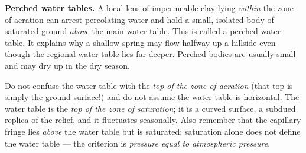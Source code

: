 \documentclass[11pt]{article}
\newcommand{\cle}[1]{{\popxbold\color{popdark}#1}}
\begin{document}
\textbf{Perched water tables.} A local lens of impermeable clay lying \emph{within} the zone of aeration can arrest percolating water and hold a small, isolated body of saturated ground \emph{above} the main water table. This is called a \cle{perched water table}. It explains why a shallow spring may flow halfway up a hillside even though the regional water table lies far deeper. Perched bodies are usually small and may dry up in the dry season.

\begin{attention}
Do not confuse the water table with the \emph{top of the zone of aeration} (that top is simply the ground surface!) and do not assume the water table is horizontal. The water table is the \emph{top of the zone of saturation}; it is a curved surface, a subdued replica of the relief, and it fluctuates seasonally. Also remember that the capillary fringe lies \emph{above} the water table but is saturated: saturation alone does not define the water table --- the criterion is \emph{pressure equal to atmospheric pressure}.
\end{attention}
\end{document}
